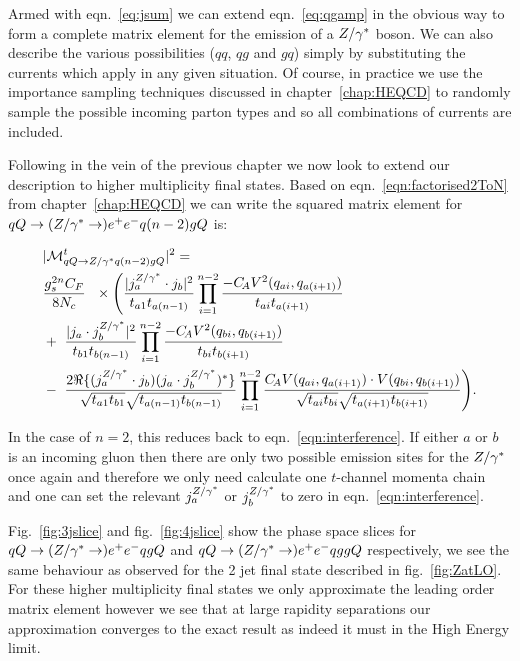 		Armed with eqn.~\eqref{eq:jsum} we can extend eqn.~\eqref{eq:qgamp} in the obvious way
		to form a complete matrix element for the emission of a $Z/\gamma^*$ boson.  We can also
		describe the various possibilities ($qq$, $qg$ and $gq$) simply by substituting
		the currents which apply in any given situation.  Of course, in practice we use
		the importance sampling techniques discussed in chapter~\ref{chap:HEQCD} to
		randomly sample the possible incoming parton types and so all combinations of
		currents are included.

		Following in the vein of the previous chapter we now look to extend our description
		to higher multiplicity final states.  Based on eqn.~\eqref{eqn:factorised2ToN} from
		chapter~\ref{chap:HEQCD} we can write the squared matrix element for
		$qQ\to (Z/\gamma^*\to ) e^+e^- q (n-2)g Q$ is:

		\begin{align}
		\begin{split}
		    &|\mathcal{M}^{t}_{qQ\to Z/\gamma^* q(n-2)gQ}|^2 = \\&\frac{g_s^{2n}C_F}{8N_c}\
		    \ \times \Bigg( \frac{| j_a^{Z/\gamma^*}\cdot j_b|^2}{t_{a1}t_{a(n-1)}} \prod^{n-2}_{i=1} \frac{-C_{\!A} V^2(q_{ai},
		      q_{a(i+1)})}{t_{ai} t_{a(i+1)}}  \\ & + \ \frac{|j_a \cdot j_b^{Z/\gamma^*} |^2}{t_{b1}t_{b(n-1)}}
		    \prod^{n-2}_{i=1}\frac{-C_{\!A} V^2(q_{bi}, q_{b(i+1)})}{t_{bi} t_{b(i+1)}}  \\
		    &-\ \frac{2\Re\{(j_a^{Z/\gamma^*}\cdot j_b)({j_a \cdot
		        j_b^{Z/\gamma^*}})^*\}}{\sqrt{t_{a1}t_{b1}}\sqrt{t_{a(n-1)} t_{b(n-1)}}}
		    \prod^{n-2}_{i=1}\frac{C_{\!A} V(q_{ai}, q_{a(i+1)})\cdot V(q_{bi},
		      q_{b(i+1)})}{\sqrt{t_{ai}t_{bi}} \sqrt{t_{a(i+1)}t_{b(i+1)}}}\Bigg).
			\label{eq:allorderreal}
		\end{split}
		\end{align}

		In the case of $n=2$, this reduces back to eqn.~\eqref{eqn:interference}.  If
		either $a$ or $b$ is an incoming gluon then there are only two possible emission sites
		for the $Z/\gamma^*$ once again and therefore we only need calculate one $t$-channel momenta chain
		and one can set the relevant $j_a^{Z/\gamma^*}$ or $j_b^{Z/\gamma^*}$ to
		zero in eqn.~\eqref{eqn:interference}.

		Fig.~\eqref{fig:3jslice} and fig.~\eqref{fig:4jslice} show the phase space
		slices for $qQ\to(Z/\gamma^*\to)e^+e^-qgQ$ and $qQ\to(Z/\gamma^*\to)e^+e^-qggQ$
		respectively, we see the same behaviour as observed for the 2 jet final state described in
		fig.~\eqref{fig:ZatLO}.  For these higher multiplicity final states we only
		approximate the leading order matrix element however we see that at large rapidity separations
		our approximation converges to the exact result as indeed it must in the High Energy limit.

